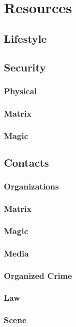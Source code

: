 \chapter{Resources}

\section{Lifestyle}

\section{Security}

\subsection{Physical}

\subsection{Matrix}

\subsection{Magic}

\section{Contacts}

\subsection{Organizations}

\subsection{Matrix}

\subsection{Magic}

\subsection{Media}

\subsection{Organized Crime}

\subsection{Law}

\subsection{Scene}
